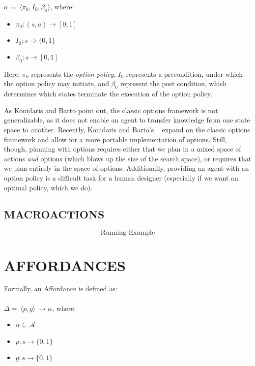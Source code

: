 \documentclass[]{article}
\begin{document}
$o\ =\ \langle \pi_0, I_0, \beta_0\rangle$, where:

\begin{itemize}
\item[] $\pi_0 : (s,a) \rightarrow [0,1]$
\item[] $I_0 : s \rightarrow \{0,1\}$
\item[] $\beta_0 : s \rightarrow [0,1]$
\end{itemize}

Here, $\pi_0$ represents the {\it option policy}, $I_0$ represents
a precondition, under which the option policy may initiate, and 
$\beta_0$ represent the post condition, which determines which 
states terminate the execution of the option policy.

As Konidaris and Barto point out, the classic options framework is not 
generalizable, as it does not enable an agent to transfer knowledge from 
one state space to another. Recently, Konidaris and Barto's ~\citep{konidaris07} 
expand on the classic options framework and allow for a more portable 
implementation of options. Still, though, planning with options requires either 
that we plan in a mixed space of actions {\it and} options (which blows up the 
size of the search space), or requires that we plan entirely in the space of options. 
Additionally, providing an agent with an option policy is a difficult task for a human 
designer (especially if we want an optimal policy, which we do).

\subsection{MACROACTIONS}

\[
\boxed{\text{Running Example}}
\]

\section{AFFORDANCES}

Formally, an Affordance is defined as: \\ \\
\vspace{1 mm} $\Delta =\ \langle p,g\rangle\ \longrightarrow \alpha$, where:

\begin{itemize}
\item[] $\alpha \subseteq \mathcal{A}$
\item[] $p : s \longrightarrow \{$0$, 1\}$
\item[] $g : s \longrightarrow \{$0$,1\}$
\end{itemize}
\end{document}
